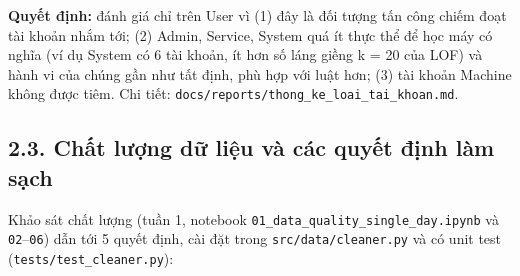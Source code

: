 \documentclass[
  11pt,
]{article}
\begin{document}
\textbf{Quyết định:} đánh giá chỉ trên User vì (1) đây là đối tượng tấn
công chiếm đoạt tài khoản nhắm tới; (2) Admin, Service, System quá ít
thực thể để học máy có nghĩa (ví dụ System có 6 tài khoản, ít hơn số
láng giềng k = 20 của LOF) và hành vi của chúng gần như tất định, phù
hợp với luật hơn; (3) tài khoản Machine không được tiêm. Chi tiết:
\texttt{docs/\allowbreak{}reports/\allowbreak{}thong\_\allowbreak{}ke\_\allowbreak{}loai\_\allowbreak{}tai\_\allowbreak{}khoan.\allowbreak{}md}.

\hypertarget{chux1ea5t-lux1b0ux1ee3ng-dux1eef-liux1ec7u-vuxe0-cuxe1c-quyux1ebft-ux111ux1ecbnh-luxe0m-sux1ea1ch}{%
\subsection{2.3. Chất lượng dữ liệu và các quyết định làm
sạch}\label{chux1ea5t-lux1b0ux1ee3ng-dux1eef-liux1ec7u-vuxe0-cuxe1c-quyux1ebft-ux111ux1ecbnh-luxe0m-sux1ea1ch}}

Khảo sát chất lượng (tuần 1, notebook
\texttt{01\_\allowbreak{}data\_\allowbreak{}quality\_\allowbreak{}single\_\allowbreak{}day.\allowbreak{}ipynb}
và \texttt{02}--\texttt{06}) dẫn tới 5 quyết định, cài đặt trong
\texttt{src/\allowbreak{}data/\allowbreak{}cleaner.\allowbreak{}py} và
có unit test
(\texttt{tests/\allowbreak{}test\_\allowbreak{}cleaner.\allowbreak{}py}):
\end{document}
